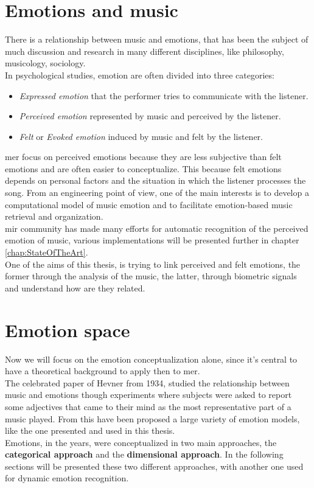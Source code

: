 \section{Emotions and music}
There is a relationship between music and emotions, that has been the subject of much discussion and research in many different disciplines, like philosophy, musicology, sociology.
\\
In psychological studies, emotion are often divided into three categories:
\begin{itemize}
	\item \textit{Expressed emotion} that the performer tries to communicate with the listener.
	\item \textit{Perceived emotion} represented by music and perceived by the listener.
	\item \textit{Felt} or \textit{Evoked emotion} induced by music and felt by the listener.
\end{itemize}
\gls{mer} focus on perceived emotions because they are less subjective than felt emotions and are often easier to conceptualize. This because felt emotions depends on personal factors and the situation in which the listener processes the song.
From an engineering point of view, one of the main interests is to develop a computational model of music emotion and to facilitate emotion-based music retrieval and organization.
\\
\gls{mir} community has made many efforts for automatic recognition of the perceived emotion of music, various implementations will be presented further in chapter \ref{chap:StateOfTheArt}.
\\ \indent
One of the aims of this thesis, is trying to link perceived and felt emotions, the former through the analysis of the music, the latter, through biometric signals and understand how are they related.

\section{Emotion space}
Now we will focus on the emotion conceptualization alone, since it's central to have a theoretical background to apply then to \gls{mer}.
\\ \indent
The celebrated paper of Hevner \cite{hevner1935expression} from 1934, studied the relationship between music and emotions though experiments where subjects were asked to report some adjectives that came to their mind as the most representative part of a music played. From this have been proposed a large variety of emotion models, like the one presented and used in this thesis.
\\ \indent
Emotions, in the years, were conceptualized in two main approaches, the \textbf{categorical approach} and the \textbf{dimensional approach}. In the following sections will be presented these two different approaches, with another one used for dynamic emotion recognition.

